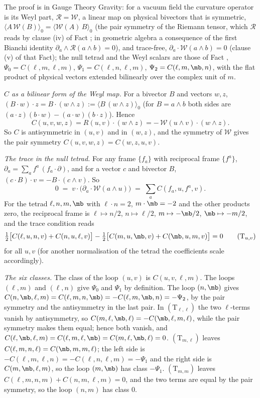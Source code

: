 The proof is in Gauge Theory Gravity: for a vacuum field the curvature operator is its Weyl part, $\mathcal{R} = \mathcal{W}$, a linear map on physical bivectors that is symmetric, $\langle A\,\mathcal{W}(B)\rangle_{0} = \langle\mathcal{W}(A)\,B\rangle_{0}$ (the pair symmetry of the Riemann tensor, which $\mathcal{R}$ reads by clause (iv) of Fact ; in geometric algebra a consequence of the first Bianchi identity $\partial_{a}\wedge\mathcal{R}(a\wedge b) = 0$), and trace-free, $\partial_{a}\cdot\mathcal{W}(a \wedge b) = 0$ (clause (v) of that Fact); the null tetrad and the Weyl scalars are those of Fact , $\Psi_{0} = C(\ell, m, \ell, m)$, $\Psi_{1} = C(\ell, n, \ell, m)$, $\Psi_{2} = C(\ell, m, \mb, n)$, with the flat product of physical vectors extended bilinearly over the complex unit of $m$.

\emph{$C$ as a bilinear form of the Weyl map.} For a bivector $B$ and vectors $w, z$, $(B\cdot w)\cdot z = B\cdot(w \wedge z) := \langle B\,(w\wedge z)\rangle_{0}$ (for $B = a \wedge b$ both sides are $(a\cdot z)(b\cdot w) - (a\cdot w)(b\cdot z)$). Hence
\[
C(u, v, w, z) = R(u, v)\cdot(w \wedge z) = -\,\mathcal{W}(u \wedge v)\cdot(w \wedge z).
\]
So $C$ is antisymmetric in $(u, v)$ and in $(w, z)$, and the symmetry of $\mathcal{W}$ gives the pair symmetry $C(u, v, w, z) = C(w, z, u, v)$.

\emph{The trace in the null tetrad.} For any frame $\{f_{a}\}$ with reciprocal frame $\{f^{a}\}$, $\partial_{a} = \sum_{a} f^{a}\,(f_{a}\cdot\partial)$, and for a vector $c$ and bivector $B$, $(c\cdot B)\cdot v = -B\cdot(c \wedge v)$. So
\[
0 \;=\; v\cdot\bigl(\partial_{a}\cdot\mathcal{W}(a \wedge u)\bigr) \;=\; \sum_{a} C(f_{a}, u, f^{a}, v) .
\]
For the tetrad $\ell, n, m, \mb$ with $\ell\cdot n = 2$, $m\cdot\mb = -2$ and the other products zero, the reciprocal frame is $\ell \mapsto n/2$, $n \mapsto \ell/2$, $m \mapsto -\mb/2$, $\mb \mapsto -m/2$, and the trace condition reads
\[
\tfrac12\bigl[C(\ell, u, n, v) + C(n, u, \ell, v)\bigr] - \tfrac12\bigl[C(m, u, \mb, v) + C(\mb, u, m, v)\bigr] = 0 \qquad (\mathrm{T}_{u,v})
\]
for all $u, v$ (for another normalisation of the tetrad the coefficients scale accordingly).

\emph{The six classes.} The class of the loop $(u, v)$ is $C(u, v, \ell, m)$. The loops $(\ell, m)$ and $(\ell, n)$ give $\Psi_{0}$ and $\Psi_{1}$ by definition. The loop $(n, \mb)$ gives $C(n, \mb, \ell, m) = C(\ell, m, n, \mb) = -C(\ell, m, \mb, n) = -\Psi_{2}$, by the pair symmetry and the antisymmetry in the last pair. In $(\mathrm{T}_{\ell, \ell})$ the two $\ell$-terms vanish by antisymmetry, so $C(m, \ell, \mb, \ell) = -C(\mb, \ell, m, \ell)$, while the pair symmetry makes them equal; hence both vanish, and $C(\ell, \mb, \ell, m) = C(\ell, m, \ell, \mb) = C(m, \ell, \mb, \ell) = 0$. $(\mathrm{T}_{m, \ell})$ leaves $C(\ell, m, n, \ell) = C(\mb, m, m, \ell)$; the left side is $-C(\ell, m, \ell, n) = -C(\ell, n, \ell, m) = -\Psi_{1}$ and the right side is $C(m, \mb, \ell, m)$, so the loop $(m, \mb)$ has class $-\Psi_{1}$. $(\mathrm{T}_{m, m})$ leaves $C(\ell, m, n, m) + C(n, m, \ell, m) = 0$, and the two terms are equal by the pair symmetry, so the loop $(n, m)$ has class $0$.

